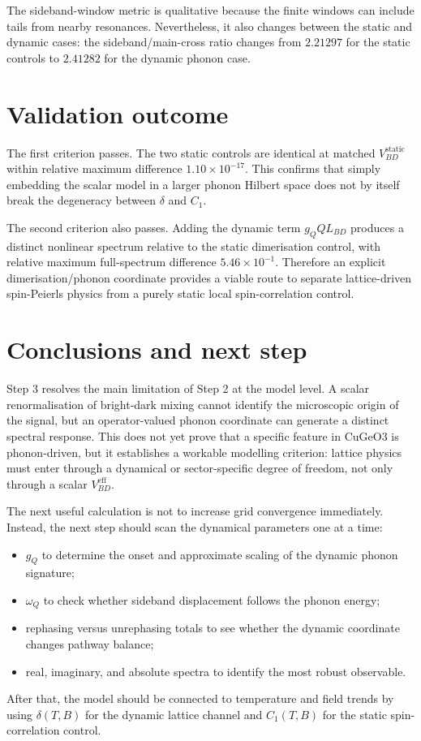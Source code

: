 \documentclass[11pt]{article}
\begin{document}
The sideband-window metric is qualitative because the finite windows can include
tails from nearby resonances.  Nevertheless, it also changes between the static
and dynamic cases: the sideband/main-cross ratio changes from $2.21297$ for the
static controls to $2.41282$ for the dynamic phonon case.

\section{Validation outcome}
The first criterion passes.  The two static controls are identical at matched
$V_{BD}^{\mathrm{static}}$ within relative maximum difference
$1.10\times10^{-17}$.  This confirms that simply embedding the scalar model in
a larger phonon Hilbert space does not by itself break the degeneracy between
$\delta$ and $C_1$.

The second criterion also passes.  Adding the dynamic term $g_Q Q L_{BD}$
produces a distinct nonlinear spectrum relative to the static dimerisation
control, with relative maximum full-spectrum difference $5.46\times10^{-1}$.
Therefore an explicit dimerisation/phonon coordinate provides a viable route to
separate lattice-driven spin-Peierls physics from a purely static local
spin-correlation control.

\section{Conclusions and next step}
Step 3 resolves the main limitation of Step 2 at the model level.  A scalar
renormalisation of bright-dark mixing cannot identify the microscopic origin of
the signal, but an operator-valued phonon coordinate can generate a distinct
spectral response.  This does not yet prove that a specific feature in CuGeO3 is
phonon-driven, but it establishes a workable modelling criterion: lattice
physics must enter through a dynamical or sector-specific degree of freedom,
not only through a scalar $V_{BD}^{\mathrm{eff}}$.

The next useful calculation is not to increase grid convergence immediately.
Instead, the next step should scan the dynamical parameters one at a time:
\begin{itemize}
\item $g_Q$ to determine the onset and approximate scaling of the dynamic
phonon signature;
\item $\omega_Q$ to check whether sideband displacement follows the phonon
energy;
\item rephasing versus unrephasing totals to see whether the dynamic coordinate
changes pathway balance;
\item real, imaginary, and absolute spectra to identify the most robust
observable.
\end{itemize}
After that, the model should be connected to temperature and field trends by
using $\delta(T,B)$ for the dynamic lattice channel and $C_1(T,B)$ for the
static spin-correlation control.
\end{document}
